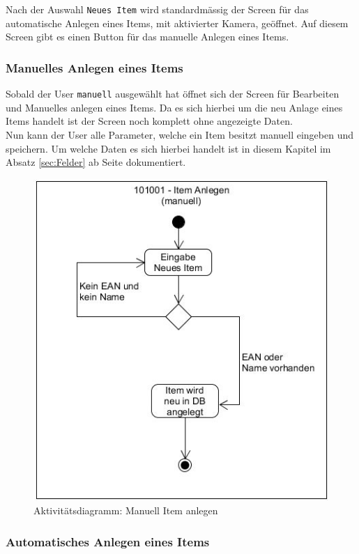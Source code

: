 Nach der Auswahl {\color{IndianRed}\texttt{Neues Item}} wird standardmässig der Screen für das automatische Anlegen eines Items, mit aktivierter Kamera, geöffnet. Auf diesem Screen gibt es einen Button für das manuelle Anlegen eines Items.

\subsubsection{Manuelles Anlegen eines Items}

Sobald der User {\color{IndianRed}\texttt{manuell}} ausgewählt hat öffnet sich der Screen für Bearbeiten und Manuelles anlegen eines Items. Da es sich hierbei um die neu Anlage eines Items handelt ist der Screen noch komplett ohne angezeigte Daten.\\

Nun kann der User alle Parameter, welche ein Item besitzt manuell eingeben und speichern. Um welche Daten es sich hierbei handelt ist in diesem Kapitel im Absatz \ref{sec:Felder} ab Seite \pageref{sec:Felder} dokumentiert.

\begin{figure}[htbp]
	\centering
	\includegraphics[scale=0.6]{pic/101001m}
	\caption{Aktivitätsdiagramm: Manuell Item anlegen}
\end{figure}

\subsubsection{Automatisches Anlegen eines Items}

